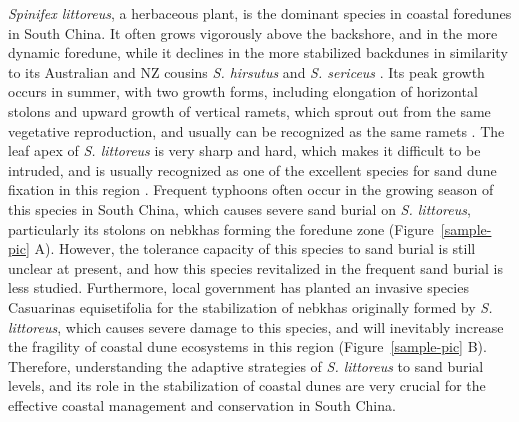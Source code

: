 \documentclass[]{interact}
\theoremstyle{plain}%
\theoremstyle{definition}
\theoremstyle{remark}
\begin{document}
\label{Introduction-4}
\textit{Spinifex littoreus}, a herbaceous plant, is the dominant species in coastal foredunes in South China. It often grows vigorously above the backshore, and in the more dynamic foredune, while it declines in the more stabilized backdunes in similarity to its Australian and NZ cousins \textit{S. hirsutus} and \textit{S. sericeus} \citep{hespReviewBiologicalGeomorphological1989}. Its peak growth occurs in summer, with two growth forms, including elongation of horizontal stolons and upward growth of vertical ramets, which sprout out from the same vegetative reproduction, and usually can be recognized as the same ramets \citep{jacksonPopulationBiologyEvolution1985}. The leaf apex of \textit{S. littoreus} is very sharp and hard, which makes it difficult to be intruded, and is usually recognized as one of the excellent species for sand dune fixation in this region \citep{xian-jiDiurnalVariationCharacteristics2017}. Frequent typhoons often occur in the growing season of this species in South China, which causes severe sand burial on \textit{S. littoreus}, particularly its stolons on nebkhas forming the foredune zone \citep{xian-jiDiurnalVariationCharacteristics2017}(Figure~\ref{sample-pic} A). However, the tolerance capacity of this species to sand burial is still unclear at present, and how this species revitalized in the frequent sand burial is less studied. Furthermore, local government has planted an invasive species Casuarinas equisetifolia for the stabilization of nebkhas originally formed by \textit{S. littoreus}, which causes severe damage to this species, and will inevitably increase the fragility of coastal dune ecosystems in this region (Figure~\ref{sample-pic} B). Therefore, understanding the adaptive strategies of \textit{S. littoreus} to sand burial levels, and its role in the stabilization of coastal dunes are very crucial for the effective coastal management and conservation in South China. 
\end{document}
